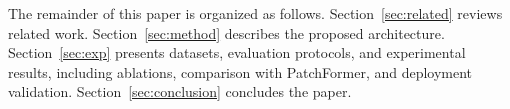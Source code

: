 The remainder of this paper is organized as follows.
Section~\ref{sec:related} reviews related work.
Section~\ref{sec:method} describes the proposed architecture.
Section~\ref{sec:exp} presents datasets, evaluation protocols, and
experimental results, including ablations, comparison with
PatchFormer, and deployment validation.
Section~\ref{sec:conclusion} concludes the paper.
